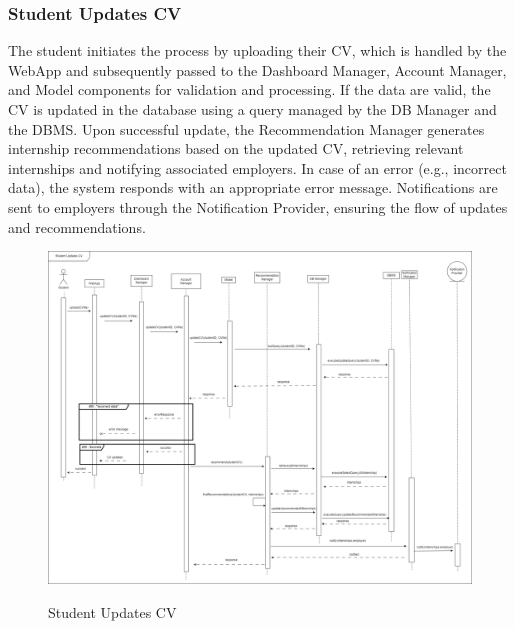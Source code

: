 \documentclass[a4paper,12pt]{article}
\begin{document}
\subsubsection*{Student Updates CV}
The student initiates the process by uploading their CV, which is handled by the WebApp and subsequently passed to the Dashboard Manager, Account Manager, and Model components for validation and processing. If the data are valid, the CV is updated in the database using a query managed by the DB Manager and the DBMS. Upon successful update, the Recommendation Manager generates internship recommendations based on the updated CV, retrieving relevant internships and notifying associated employers. In case of an error (e.g., incorrect data), the system responds with an appropriate error message. Notifications are sent to employers through the Notification Provider, ensuring the flow of updates and recommendations.
\begin{figure}[H]
\centering
\includegraphics[scale = 0.30]{DD_figures/RuntimeView/StudentUpdatesCV_RV.drawio.png}\\
\caption{Student Updates CV}
\end{figure}
\end{document}
